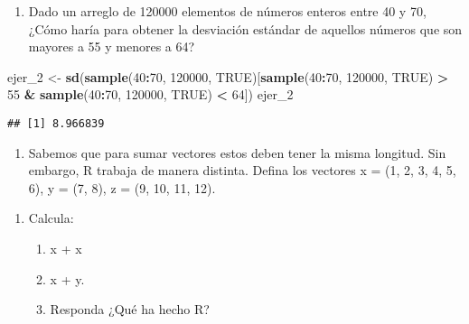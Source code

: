 \documentclass[
]{article}
\newenvironment{Shaded}{\begin{snugshade}}{\end{snugshade}}
\newcommand{\ConstantTok}[1]{\textcolor[rgb]{0.56,0.35,0.01}{#1}}
\newcommand{\DecValTok}[1]{\textcolor[rgb]{0.00,0.00,0.81}{#1}}
\newcommand{\FunctionTok}[1]{\textcolor[rgb]{0.13,0.29,0.53}{\textbf{#1}}}
\newcommand{\NormalTok}[1]{#1}
\newcommand{\OtherTok}[1]{\textcolor[rgb]{0.56,0.35,0.01}{#1}}
\newcommand{\SpecialCharTok}[1]{\textcolor[rgb]{0.81,0.36,0.00}{\textbf{#1}}}
\providecommand{\tightlist}{%
  \setlength{\itemsep}{0pt}\setlength{\parskip}{0pt}}
\begin{document}
\begin{enumerate}
\def\labelenumi{\arabic{enumi}.}
\setcounter{enumi}{1}
\tightlist
\item
  Dado un arreglo de 120000 elementos de números enteros entre 40 y 70,
  ¿Cómo haría para obtener la desviación estándar de aquellos números
  que son mayores a 55 y menores a 64?
\end{enumerate}

\begin{Shaded}
\begin{Highlighting}[]
\NormalTok{ejer\_2 }\OtherTok{\textless{}{-}} \FunctionTok{sd}\NormalTok{(}\FunctionTok{sample}\NormalTok{(}\DecValTok{40}\SpecialCharTok{:}\DecValTok{70}\NormalTok{, }\DecValTok{120000}\NormalTok{, }\ConstantTok{TRUE}\NormalTok{)[}\FunctionTok{sample}\NormalTok{(}\DecValTok{40}\SpecialCharTok{:}\DecValTok{70}\NormalTok{, }\DecValTok{120000}\NormalTok{, }\ConstantTok{TRUE}\NormalTok{) }\SpecialCharTok{\textgreater{}} \DecValTok{55} \SpecialCharTok{\&} \FunctionTok{sample}\NormalTok{(}\DecValTok{40}\SpecialCharTok{:}\DecValTok{70}\NormalTok{, }\DecValTok{120000}\NormalTok{, }\ConstantTok{TRUE}\NormalTok{) }\SpecialCharTok{\textless{}} \DecValTok{64}\NormalTok{])}
\NormalTok{ejer\_2}
\end{Highlighting}
\end{Shaded}

\begin{verbatim}
## [1] 8.966839
\end{verbatim}

\begin{enumerate}
\def\labelenumi{\arabic{enumi}.}
\setcounter{enumi}{2}
\tightlist
\item
  Sabemos que para sumar vectores estos deben tener la misma longitud.
  Sin embargo, R trabaja de manera distinta. Defina los vectores x = (1,
  2, 3, 4, 5, 6), y = (7, 8), z = (9, 10, 11, 12).
\end{enumerate}

\begin{enumerate}
\def\labelenumi{\alph{enumi}.}
\tightlist
\item
  Calcula:

  \begin{enumerate}
  \def\labelenumii{\roman{enumii}.}
  \tightlist
  \item
    x + x
  \item
    x + y.
  \item
    Responda ¿Qué ha hecho R?
  \end{enumerate}
\end{enumerate}
\end{document}
